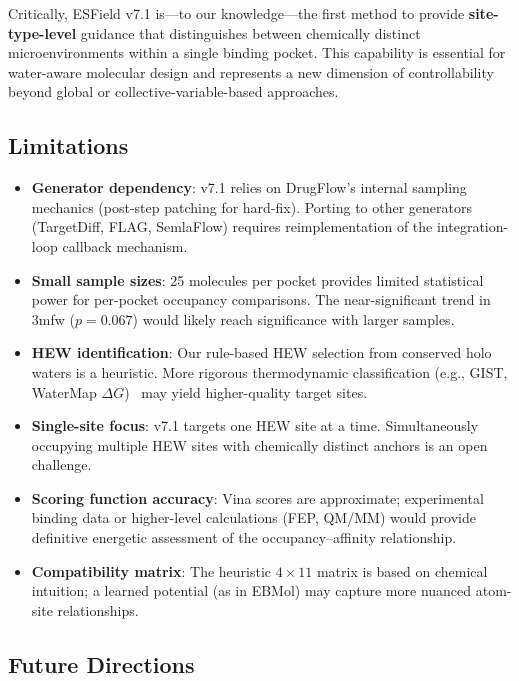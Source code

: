 \documentclass[11pt,letterpaper]{article}
\begin{document}
Critically, ESField v7.1 is---to our knowledge---the first method to provide
\textbf{site-type-level} guidance that distinguishes between chemically distinct
microenvironments within a single binding pocket.  This capability is essential
for water-aware molecular design and represents a new dimension of
controllability beyond global or collective-variable-based approaches.

\subsection{Limitations}

\begin{itemize}
  \item \textbf{Generator dependency}: v7.1 relies on DrugFlow's internal
    sampling mechanics (post-step patching for hard-fix).  Porting to other
    generators (TargetDiff, FLAG, SemlaFlow) requires reimplementation of the
    integration-loop callback mechanism.
  \item \textbf{Small sample sizes}: 25 molecules per pocket provides limited
    statistical power for per-pocket occupancy comparisons.  The near-significant
    trend in 3mfw ($p=0.067$) would likely reach significance with larger
    samples.
  \item \textbf{HEW identification}: Our rule-based HEW selection from conserved
    holo waters is a heuristic.  More rigorous thermodynamic classification
    (e.g., GIST, WaterMap $\Delta G$)~\cite{abel2008,nguyen2012} may yield
    higher-quality target sites.
  \item \textbf{Single-site focus}: v7.1 targets one HEW site at a time.
    Simultaneously occupying multiple HEW sites with chemically distinct anchors
    is an open challenge.
  \item \textbf{Scoring function accuracy}: Vina scores are approximate;
    experimental binding data or higher-level calculations (FEP, QM/MM) would
    provide definitive energetic assessment of the occupancy--affinity
    relationship.
  \item \textbf{Compatibility matrix}: The heuristic $4 \times 11$ matrix is
    based on chemical intuition; a learned potential (as in EBMol) may capture
    more nuanced atom-site relationships.
\end{itemize}

\subsection{Future Directions}
\end{document}
